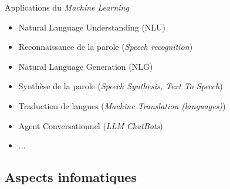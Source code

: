 \documentclass[11pt,serif,mathserif,compress,hyperref={colorlinks}]{beamer}
\begin{document}
\begin{frame}{Applications du {\em Machine Learning}}

  \begin{tcolorbox}[title=Traitement du langage naturel ({\em{\small Natural Language Processing}}), add to width=7mm, left skip=-8mm]
    \begin{itemize}
    \item<2-> Natural Language Understanding (NLU) \smallskip
    \item<2-> Reconnaissance de la parole ({\em Speech recognition}) \smallskip
    \item<3-> Natural Language Generation (NLG) \smallskip
    \item<3-> Synthèse de la parole  ({\em Speech Synthesis, Text To Speech}) \smallskip
    \item<3-> Traduction de langues ({\em Machine Translation (languages)}) \smallskip
    \item<4-> Agent Conversationnel ({\em LLM ChatBots}) \smallskip
    \item<4-> ...
    \end{itemize}
  \end{tcolorbox}   
  
\end{frame}

\subsection{Aspects infomatiques}
\end{document}
